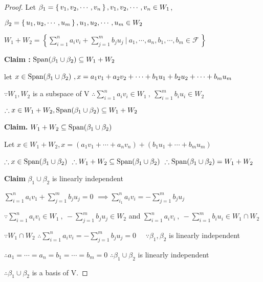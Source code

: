 \begin{proof}
	Let $\beta_1 = \left\{ \,v_1,v_2,\cdots,v_n \,\right\},v_1,v_2,\cdots,v_n \in W_1$,
		
		 $\beta_2 = \left\{ \,u_1,u_2,\cdots,u_m \,\right\},u_1,u_2,\cdots,u_m \in W_2$
		
		$W_1 + W_2 = \left\{\sum_{i=1}^n a_iv_i + \sum_{j=1}^{m}b_ju_j ~|~ a_1,\cdots,a_n,b_1,\cdots,b_m \in \mathcal{F}\,\right\} $
		\vspace*{0.2cm}
		
		\textbf{Claim : } $\text{Span($\beta_1 \cup \beta_2$)} \subseteq W_1 + W_2$
		
		let $x \in \text{Span($\beta_1 \cup \beta_2$)}~, x = a_1v_1 + a_2v_2 + \cdots + b_1u_1 + b_2u_2 + \cdots + b_mu_m$
		
		$\because W_1,W_2$ is a subspace of V $\therefore \sum^{n}_{i=1}a_iv_i \in W_1~,~ \sum^{m}_{i=1}b_iu_i \in W_2$
		
		$\therefore x \in W_1 + W_2,\text{Span($\beta_1 \cup \beta_2$)} \subseteq W_1 + W_2$
		
		\vspace*{0.3cm}
		\textbf{Claim.} $W_1 + W_2 \subseteq \text{Span($\beta_1 \cup \beta_2$)}$
		
		Let $x \in W_1 + W_2, x = (a_1v_1 + \cdots + a_nv_n) + (b_1u_1 + \cdots  + b_mu_m)$
		
		$\therefore x \in \text{Span($\beta_1 \cup \beta_2$)}$\ 
		$\therefore W_1 + W_2 \subseteq \text{Span($\beta_1 \cup \beta_2$)}$\ 
		$\therefore \text{Span($\beta_1 \cup \beta_2$)} = W_1 + W_2$

		
	    \vspace*{0.3cm}
		\textbf{Claim} ${\beta_1 \cup \beta_2}$ is linearly independent
		
		$\sum^n_{i=1}a_iv_1 + \sum^m_{j=1}b_ju_j = 0$ 
		$\implies\sum^n_{i_1}a_iv_i = -\sum^m_{j=1}b_ju_j$
		
		$\because \sum^n_{i=1}a_iv_i \in W_1~,~ -\sum^m_{j=1}b_ju_j \in W_2$ and $\sum^n_{i=1}a_iv_i~,~-\sum^m_{i=1}b_iu_i \in W_1 \cap W_2$ 
		
		$\because W_1 \cap W_2$ $\therefore \sum^n_{i=1}a_iv_i = -\sum^m_{j=1}b_ju_j = 0$ \ \ $\because \beta_1 , \beta_2$ is linearly independent
		
		$\therefore a_1 = \cdots = a_n = b_1=\cdots = b_m =0$ $\therefore \beta_1 \cup \beta_2$ is linearly independent
		
		$\therefore \beta_1 \cup \beta_2$ is a basis of V.

\end{proof}